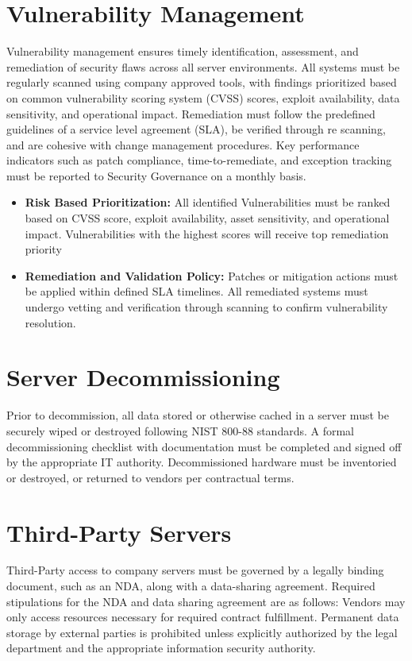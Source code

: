 \section{Vulnerability Management}
Vulnerability management ensures timely identification, assessment, and remediation of security flaws across all server environments. All systems must be regularly scanned using company approved tools, with findings prioritized based on common vulnerability scoring system (CVSS) scores, exploit availability, data sensitivity, and operational impact. Remediation must follow the predefined guidelines of a service level agreement (SLA), be verified through re scanning, and are cohesive with change management procedures. Key performance indicators such as patch compliance, time-to-remediate, and exception tracking must be reported to Security Governance on a monthly basis.
\begin{itemize}
    \item \textbf{Risk Based Prioritization:}
    All identified Vulnerabilities must be ranked based on CVSS score, exploit availability, asset sensitivity, and operational impact. Vulnerabilities with the highest scores will receive top remediation priority
    \item \textbf{Remediation and Validation Policy:}
    Patches or mitigation actions must be applied within defined SLA timelines. All remediated systems must undergo vetting and verification through scanning to confirm vulnerability resolution.
\end{itemize}
\section{Server Decommissioning}
Prior to decommission, all data stored or otherwise cached in a server must be securely wiped or destroyed following NIST 800-88 standards. A formal decommissioning checklist with documentation must be completed and signed off by the appropriate IT authority. Decommissioned hardware must be inventoried or destroyed, or returned to vendors per contractual terms.

\section{Third-Party Servers}
Third-Party access to company servers must be governed by a legally binding document, such as an NDA, along with a data-sharing agreement. Required stipulations for the NDA and data sharing agreement are as follows: Vendors may only access resources necessary for required contract fulfillment. Permanent data storage by external parties is prohibited unless explicitly authorized by the legal department and the appropriate information security authority.

